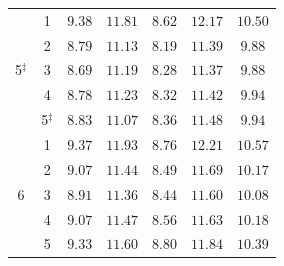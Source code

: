 \documentclass[transmag]{IEEEtran}
\begin{document}
\begin{table}[!t]
{\begin{tabular}{c|c|cccc|c}
\midrule
\multirow{5}{*}{5$^{\ddagger}$} 
  & 1& $9.38$&$11.81$&$8.62$&$12.17$&$10.50$\\
  & 2 &$8.79$&$11.13$&$\bm{8.19}$&$11.39$&$\bm{9.88}$
\\
  & 3 &$\bm{8.69}$&$11.19$&$8.28$&$\bm{11.37}$&$\bm{9.88}$
\\
  & 4 &$8.78$&$11.23$&$8.32$&$11.42$&$9.94$
\\
  & 5$^{\ddagger}$ &$8.83$&$\bm{11.07}$&$8.36$&$11.48$&$9.94$\\
\midrule
\multirow{5}{*}{6} 
  & 1& $9.37$&$11.93$&$8.76$&$12.21$&$10.57$  \\
  & 2& $9.07$&$11.44$&$8.49$&$11.69$&$10.17$   \\
  & 3& $\bm{8.91}$&$\bm{11.36}$&$\bm{8.44}$&$\bm{11.60}$&$\bm{10.08}$ \\
  & 4& $9.07$&$11.47$&$8.56$&$11.63$&$10.18$\\
  & 5& $9.33$&$11.60$&$8.80$&$11.84$&$10.39 $\\
\midrule[0.2pt]
\bottomrule
\end{tabular}%

}
\label{tab:supple_exp_results_apc_paras}
\end{table}
\end{document}
